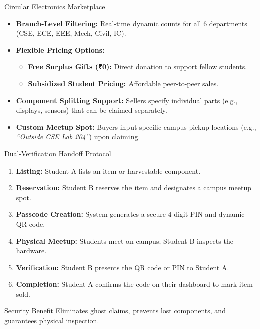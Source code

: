\documentclass{beamer}
\begin{document}
\begin{frame}{Circular Electronics Marketplace}

\begin{itemize}
    \setlength\itemsep{0.3cm}
    \item \textbf{Branch-Level Filtering:} Real-time dynamic counts for all 6 departments (CSE, ECE, EEE, Mech, Civil, IC).

    \item \textbf{Flexible Pricing Options:}
    \begin{itemize}
        \item \textbf{Free Surplus Gifts (₹0):} Direct donation to support fellow students.
        \item \textbf{Subsidized Student Pricing:} Affordable peer-to-peer sales.
    \end{itemize}

    \item \textbf{Component Splitting Support:} Sellers specify individual parts (e.g., displays, sensors) that can be claimed separately.

    \item \textbf{Custom Meetup Spot:} Buyers input specific campus pickup locations (e.g., \textit{``Outside CSE Lab 204''}) upon claiming.
\end{itemize}

\end{frame}


\begin{frame}{Dual-Verification Handoff Protocol}

\begin{enumerate}
    \setlength\itemsep{0.18cm}
    \item \textbf{Listing:} Student A lists an item or harvestable component.
    \item \textbf{Reservation:} Student B reserves the item and designates a campus meetup spot.
    \item \textbf{Passcode Creation:} System generates a secure 4-digit PIN and dynamic QR code.
    \item \textbf{Physical Meetup:} Students meet on campus; Student B inspects the hardware.
    \item \textbf{Verification:} Student B presents the QR code or PIN to Student A.
    \item \textbf{Completion:} Student A confirms the code on their dashboard to mark item sold.
\end{enumerate}

\vspace{0.15cm}
\begin{alertblock}{Security Benefit}
\small Eliminates ghost claims, prevents lost components, and guarantees physical inspection.
\end{alertblock}

\end{frame}
\end{document}
